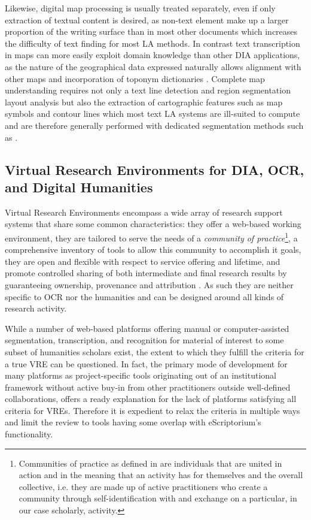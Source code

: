 Likewise, digital map processing is usually treated separately, even if only
extraction of textual content is desired, as non-text element make up a larger
proportion of the writing surface than in most other documents which increases
the difficulty of text finding for most LA methods. In contrast text
transcription in maps can more easily exploit domain knowledge than other DIA
applications, as the nature of the geographical data expressed naturally allows
alignment with other maps and incorporation of toponym
dictionaries \cite{weinman2013toponym,weinman17geographic,sun2020aligning}.
Complete map understanding requires not only a text line detection and region
segmentation layout analysis but also the extraction of cartographic features
such as map symbols and contour lines which most text LA systems are ill-suited
to compute and are therefore generally performed with dedicated segmentation
methods such as \cite{uhl2018spatialising,liu2020superpixel}.

\subsection{Virtual Research Environments for DIA, OCR, and Digital Humanities}

Virtual Research Environments encompass a wide array of research support
systems that share some common characteristics: they offer a web-based working
environment, they are tailored to serve the needs of a \emph{community of
practice}\footnote{Communities of practice as defined in
\cite{wenger1999communities} are individuals that are united in action and in
the meaning that an activity has for themselves and the overall collective,
i.e. they are made up of active practitioners who create a community through
self-identification with and exchange on a particular, in our case scholarly,
activity.}, a comprehensive inventory of tools to allow this community to
accomplish it goals, they are open and flexible with respect to service
offering and lifetime, and promote controlled sharing of both intermediate and
final research results by guaranteeing ownership, provenance and
attribution \cite{candela2013virtual}. As such they are neither specific to OCR
nor the humanities and can be designed around all kinds of research activity.

While a number of web-based platforms offering manual or computer-assisted
segmentation, transcription, and recognition for material of interest to some
subset of humanities scholars exist, the extent to which they fulfill the
criteria for a true VRE can be questioned. In fact, the primary mode of
development for many platforms as project-specific tools originating out of an
institutional framework without active buy-in from other practitioners outside
well-defined collaborations, offers a ready explanation for the lack of
platforms satisfying all criteria for VREs. Therefore it is expedient to relax
the criteria in multiple ways and limit the review to tools having some overlap
with eScriptorium's functionality.

